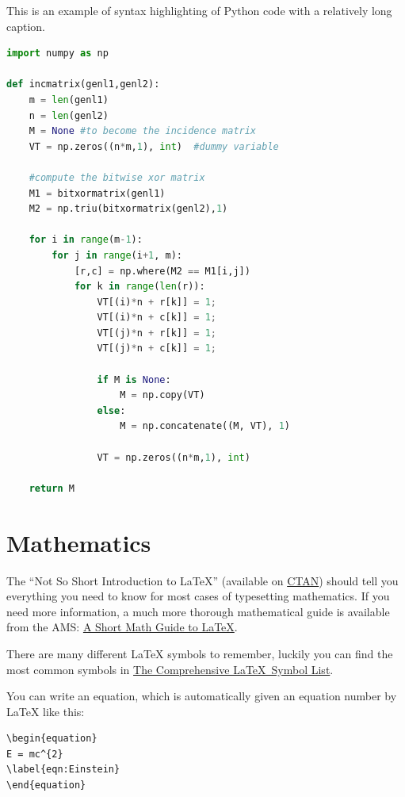 \begin{lstfloat}
\caption{\label{lst:listing} This is an example of syntax highlighting of Python code with a relatively long caption.}
\begin{lstlisting}[language=Python]
import numpy as np
 
def incmatrix(genl1,genl2):
    m = len(genl1)
    n = len(genl2)
    M = None #to become the incidence matrix
    VT = np.zeros((n*m,1), int)  #dummy variable
 
    #compute the bitwise xor matrix
    M1 = bitxormatrix(genl1)
    M2 = np.triu(bitxormatrix(genl2),1) 
 
    for i in range(m-1):
        for j in range(i+1, m):
            [r,c] = np.where(M2 == M1[i,j])
            for k in range(len(r)):
                VT[(i)*n + r[k]] = 1;
                VT[(i)*n + c[k]] = 1;
                VT[(j)*n + r[k]] = 1;
                VT[(j)*n + c[k]] = 1;
 
                if M is None:
                    M = np.copy(VT)
                else:
                    M = np.concatenate((M, VT), 1)
 
                VT = np.zeros((n*m,1), int)
 
    return M
\end{lstlisting}
\end{lstfloat}


\section{Mathematics}

The \enquote{Not So Short Introduction to LaTeX} (available on \href{http://www.ctan.org/tex-archive/info/lshort/english/lshort.pdf}{CTAN}) should tell you everything you need to know for most cases of typesetting mathematics. If you need more information, a much more thorough mathematical guide is available from the AMS: \href{{ftp://ftp.ams.org/pub/tex/doc/amsmath/short-math-guide.pdf}}{A Short Math Guide to LaTeX}.

There are many different LaTeX symbols to remember, luckily you can find the most common symbols in \href{http://ctan.org/pkg/comprehensive}{The Comprehensive \LaTeX~Symbol List}.

You can write an equation, which is automatically given an equation number by LaTeX like this:
\begin{lstlisting}[language={[LaTeX]TeX}]
\begin{equation}
E = mc^{2}
\label{eqn:Einstein}
\end{equation}
\end{lstlisting}

